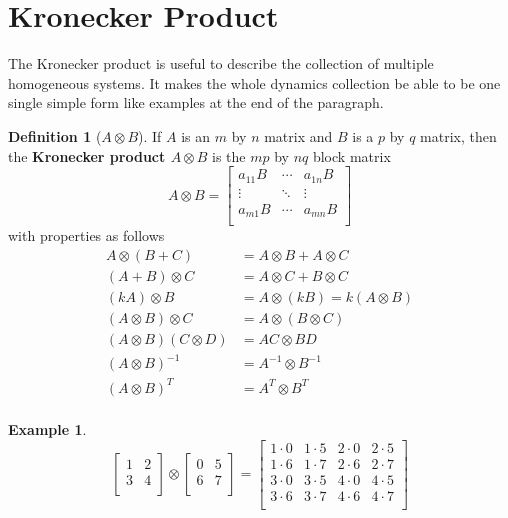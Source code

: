 \documentclass[11pt, a4paper, oneside, openany, reqno]{book}
\newtheorem{example}{Example}
\theoremstyle{definition}
\newtheorem{definition}[theorem]{Definition}
\theoremstyle{remark}
\numberwithin{equation}{chapter} %
\begin{document}
\section{Kronecker Product}

The Kronecker product is useful to describe the collection of multiple homogeneous systems.
It makes the whole dynamics collection be able to be one single simple 
form like examples at the end of the paragraph.

\begin{definition}[$ A \otimes B $]
	If $ A $ is an $ m $ by $ n $ matrix and $ B $ is a $ p $ by $ q $ matrix, 
	then the \textbf{Kronecker product $A \otimes B$} is the $ mp $ by $ nq $ block matrix
	\begin{equation}
	A \otimes B = \left[ \begin{array}{ccc} 
	a_{11} B & \cdots & a_{1n}B \\ 
	\vdots & \ddots & \vdots \\ 
	a_{m1} B & \cdots & a_{mn} B\\ 
	\end{array} \right]
	\end{equation}
	with properties as follows
	\begin{equation}\begin{split}
	  A \otimes (B+C) &= A \otimes B + A \otimes C \\
	 (A+B) \otimes C &= A \otimes C + B \otimes C \\
	 (kA) \otimes B &= A \otimes (kB) = k(A \otimes B) \\
	 (A \otimes B) \otimes C &= A \otimes (B \otimes C) \\ 
	 (A \otimes B)(C \otimes D) &= AC \otimes BD \\
	 (A \otimes B)^{-1} &= A^{-1} \otimes B^{-1} \\
	 (A\otimes B)^T &= A^T \otimes B^T \\
	\end{split}\end{equation}
\end{definition}

\begin{example}
	\begin{equation}
	\left[ \begin{array}{cc} 1 & 2 \\ 3 & 4 \\ \end{array} \right] 
	\otimes \left[ \begin{array}{cc} 0 & 5 \\ 6 & 7 \\ \end{array} \right] =
	\left[ \begin{array}{cccc} 1\cdot 0 & 1\cdot 5 & 2\cdot 0 & 2\cdot 5 \\ 
	1\cdot 6 & 1\cdot 7 & 2\cdot 6 & 2\cdot 7 \\ 
	3\cdot 0 & 3\cdot 5 & 4\cdot 0 & 4\cdot 5 \\ 
	3\cdot 6 & 3\cdot 7 & 4\cdot 6 & 4\cdot 7 \\ \end{array}\right]
	\end{equation}
\end{example}
\end{document}
